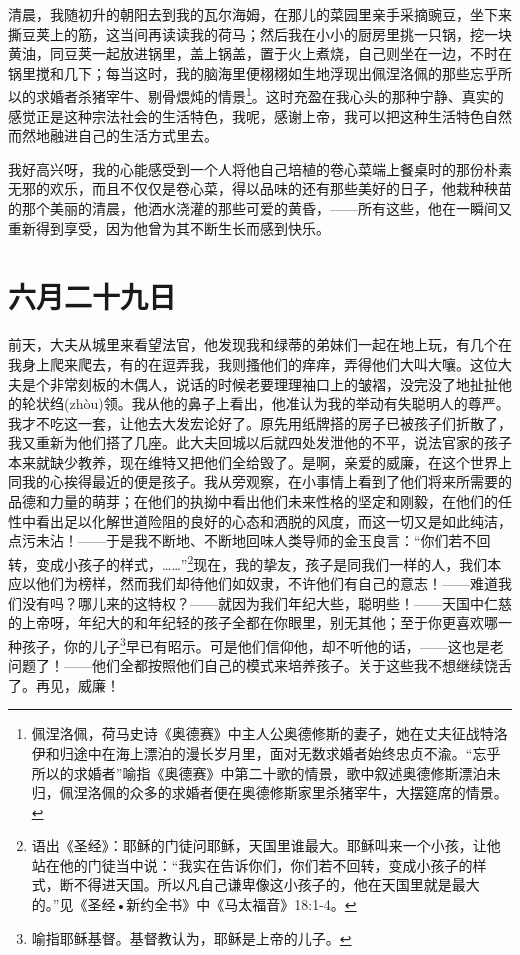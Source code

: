 \documentclass[12pt,oneside]{book}
\begin{document}
清晨，我随初升的朝阳去到我的瓦尔海姆，在那儿的菜园里亲手采摘豌豆，坐下来撕豆荚上的筋，这当间再读读我的荷马；然后我在小小的厨房里挑一只锅，挖一块黄油，同豆荚一起放进锅里，盖上锅盖，置于火上煮烧，自己则坐在一边，不时在锅里搅和几下；每当这时，我的脑海里便栩栩如生地浮现出佩涅洛佩的那些忘乎所以的求婚者杀猪宰牛、剔骨煨炖的情景\footnote{佩涅洛佩，荷马史诗《奥德赛》中主人公奥德修斯的妻子，她在丈夫征战特洛伊和归途中在海上漂泊的漫长岁月里，面对无数求婚者始终忠贞不渝。“忘乎所以的求婚者”喻指《奥德赛》中第二十歌的情景，歌中叙述奥德修斯漂泊未归，佩涅洛佩的众多的求婚者便在奥德修斯家里杀猪宰牛，大摆筵席的情景。}。这时充盈在我心头的那种宁静、真实的感觉正是这种宗法社会的生活特色，我呢，感谢上帝，我可以把这种生活特色自然而然地融进自己的生活方式里去。

我好高兴呀，我的心能感受到一个人将他自己培植的卷心菜端上餐桌时的那份朴素无邪的欢乐，而且不仅仅是卷心菜，得以品味的还有那些美好的日子，他栽种秧苗的那个美丽的清晨，他洒水浇灌的那些可爱的黄昏，——所有这些，他在一瞬间又重新得到享受，因为他曾为其不断生长而感到快乐。

\chapter{六月二十九日}
\label{sec-2-14}
前天，大夫从城里来看望法官，他发现我和绿蒂的弟妹们一起在地上玩，有几个在我身上爬来爬去，有的在逗弄我，我则搔他们的痒痒，弄得他们大叫大嚷。这位大夫是个非常刻板的木偶人，说话的时候老要理理袖口上的皱褶，没完没了地扯扯他的轮状绉(zhòu)领。我从他的鼻子上看出，他准认为我的举动有失聪明人的尊严。我才不吃这一套，让他去大发宏论好了。原先用纸牌搭的房子已被孩子们折散了，我又重新为他们搭了几座。此大夫回城以后就四处发泄他的不平，说法官家的孩子本来就缺少教养，现在维特又把他们全给毁了。是啊，亲爱的威廉，在这个世界上同我的心挨得最近的便是孩子。我从旁观察，在小事情上看到了他们将来所需要的品德和力量的萌芽；在他们的执拗中看出他们未来性格的坚定和刚毅，在他们的任性中看出足以化解世道险阻的良好的心态和洒脱的风度，而这一切又是如此纯洁，点污未沾！——于是我不断地、不断地回味人类导师的金玉良言：“你们若不回转，变成小孩子的样式，……”\footnote{语出《圣经》：耶稣的门徒问耶稣，天国里谁最大。耶稣叫来一个小孩，让他站在他的门徒当中说：“我实在告诉你们，你们若不回转，变成小孩子的样式，断不得进天国。所以凡自己谦卑像这小孩子的，他在天国里就是最大的。”见《圣经•新约全书》中《马太福音》18:1-4。}现在，我的挚友，孩子是同我们一样的人，我们本应以他们为榜样，然而我们却待他们如奴隶，不许他们有自己的意志！——难道我们没有吗？哪儿来的这特权？——就因为我们年纪大些，聪明些！——天国中仁慈的上帝呀，年纪大的和年纪轻的孩子全都在你眼里，别无其他；至于你更喜欢哪一种孩子，你的儿子\footnote{喻指耶稣基督。基督教认为，耶稣是上帝的儿子。}早已有昭示。可是他们信仰他，却不听他的话，——这也是老问题了！——他们全都按照他们自己的模式来培养孩子。关于这些我不想继续饶舌了。再见，威廉！
\end{document}
